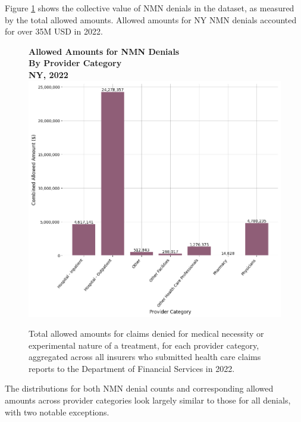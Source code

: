 \documentclass[12pt, a4paper,twoside,parskip=full]{report}
\theoremstyle{plain} %
\theoremstyle{definition} %
\theoremstyle{remark} %
\numberwithin{equation}{chapter}
\begin{document}
		Figure \ref{nynmnallowedbyprovidercat} shows the collective value of NMN denials in the dataset, as measured by the total allowed amounts. Allowed amounts for NY NMN denials accounted for over 35M USD in 2022.
		
		\begin{figure}[h!]
			\centering
			\textbf{Allowed Amounts for NMN Denials}\\
			\textbf{By Provider Category}\\
			\textbf{NY, 2022}\\
			\includegraphics[width=\columnwidth]{images/ny_claim_reports/nmn_allowed_amts_by_provider_cat.png}
			\caption{Total allowed amounts for claims denied for medical necessity or experimental nature of a treatment, for each provider category, aggregated across all insurers who submitted health care claims reports to the Department of Financial Services in 2022.}
			\label{nynmnallowedbyprovidercat}
		\end{figure}
	
		\clearpage
	
		
		The distributions for both NMN denial counts and corresponding allowed amounts across provider categories look largely similar to those for all denials, with two notable exceptions.
		
\end{document}
